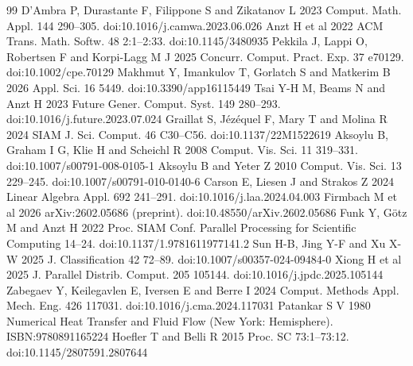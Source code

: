 \documentclass[10pt]{article}
\begin{document}
\begin{thebibliography}{99}
 D'Ambra P, Durastante F, Filippone S and Zikatanov L 2023 Comput. Math. Appl. 144 290--305. doi:10.1016/j.camwa.2023.06.026
 Anzt H et al 2022 ACM Trans. Math. Softw. 48 2:1--2:33. doi:10.1145/3480935
 Pekkila J, Lappi O, Robertsen F and Korpi-Lagg M J 2025 Concurr. Comput. Pract. Exp. 37 e70129. doi:10.1002/cpe.70129
 Makhmut Y, Imankulov T, Gorlatch S and Matkerim B 2026 Appl. Sci. 16 5449. doi:10.3390/app16115449
 Tsai Y-H M, Beams N and Anzt H 2023 Future Gener. Comput. Syst. 149 280--293. doi:10.1016/j.future.2023.07.024
 Graillat S, Jézéquel F, Mary T and Molina R 2024 SIAM J. Sci. Comput. 46 C30--C56. doi:10.1137/22M1522619
 Aksoylu B, Graham I G, Klie H and Scheichl R 2008 Comput. Vis. Sci. 11 319--331. doi:10.1007/s00791-008-0105-1
 Aksoylu B and Yeter Z 2010 Comput. Vis. Sci. 13 229--245. doi:10.1007/s00791-010-0140-6
 Carson E, Liesen J and Strakos Z 2024 Linear Algebra Appl. 692 241--291. doi:10.1016/j.laa.2024.04.003
 Firmbach M et al 2026 arXiv:2602.05686 (preprint). doi:10.48550/arXiv.2602.05686
 Funk Y, Götz M and Anzt H 2022 Proc. SIAM Conf. Parallel Processing for Scientific Computing 14--24. doi:10.1137/1.9781611977141.2
 Sun H-B, Jing Y-F and Xu X-W 2025 J. Classification 42 72--89. doi:10.1007/s00357-024-09484-0
 Xiong H et al 2025 J. Parallel Distrib. Comput. 205 105144. doi:10.1016/j.jpdc.2025.105144
 Zabegaev Y, Keilegavlen E, Iversen E and Berre I 2024 Comput. Methods Appl. Mech. Eng. 426 117031. doi:10.1016/j.cma.2024.117031
 Patankar S V 1980 Numerical Heat Transfer and Fluid Flow (New York: Hemisphere). ISBN:9780891165224
 Hoefler T and Belli R 2015 Proc. SC 73:1--73:12. doi:10.1145/2807591.2807644
\end{thebibliography}
\end{document}
